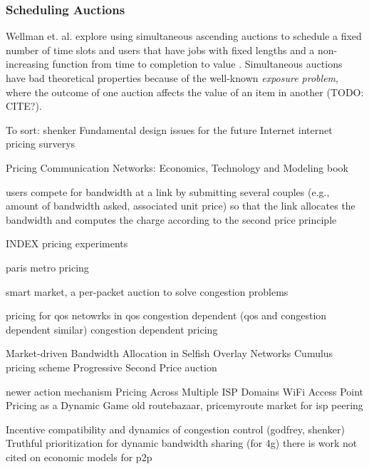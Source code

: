 \subsubsection{Scheduling Auctions}
Wellman et. al. explore using simultaneous ascending auctions to schedule a fixed number of time slots and users that have jobs with fixed lengths and a non-increasing function from time to completion to value \cite{wellman01, wellman05}.
Simultaneous auctions have bad theoretical properties because of the well-known \emph{exposure problem}, where the outcome of one auction affects the value of an item in another (TODO: CITE?).


To sort:
shenker Fundamental design issues for the future Internet \cite{shenker95}
internet pricing surverys\cite{stiller01, falkner00, odlyzko01}

Pricing Communication Networks: Economics, Technology and Modeling book \cite{courcoubetis03}

users compete for bandwidth at a link by submitting several couples (e.g., amount of bandwidth asked, associated unit price) so that the link allocates the bandwidth and computes the charge according to the second price principle \cite{maille06}


INDEX pricing experiments \cite{altmann99, edell99}

paris metro pricing \cite{odlyzko99}

smart market, a per-packet auction to solve congestion problems

pricing for qos netowrks \cite{dasilva00, marbach04}
in qos congestion dependent (qos and congestion dependent similar) \cite{shu03}
congestion dependent pricing \cite{peha97, paschalidis00, la00, la02}

Market-driven Bandwidth Allocation in Selfish Overlay Networks \cite{wang05}
Cumulus pricing scheme \cite{reichl01, stiller01cumulus, reichl01edgepricing, reichl03, hayel05}
Progressive Second Price auction  \cite{lazar98, lazar99, semret99, semret00,maille03, bitsaki05, beltran07}

newer action mechanism \cite{dramitinos07}
Pricing Across Multiple ISP Domains \cite{saberi07}
WiFi Access Point Pricing as a Dynamic Game \cite{musacchio06}
old routebazaar, pricemyroute \cite{esquivel09, pricemyroute11}
market for isp peering \cite{hau09}

Incentive compatibility and dynamics of congestion control (godfrey, shenker) \cite{godfrey10}
Truthful prioritization for dynamic bandwidth sharing (for 4g) \cite{shnayder14}
there is work not cited on economic models for p2p
